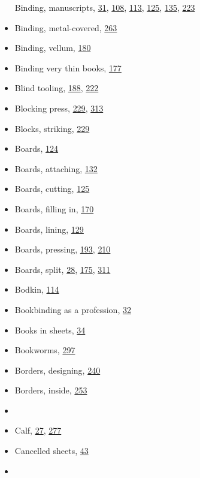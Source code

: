 \documentclass[
]{article}
\begin{document}
\begin{itemize}
  Binding, manuscripts, \protect\hyperlink{Page_31}{31},
  \protect\hyperlink{Page_108}{108}, \protect\hyperlink{Page_113}{113},
  \protect\hyperlink{Page_125}{125}, \protect\hyperlink{Page_135}{135},
  \protect\hyperlink{Page_223}{223}
\item
  Binding, metal-covered, \protect\hyperlink{Page_263}{263}
\item
  Binding, vellum, \protect\hyperlink{Page_180}{180}
\item
  Binding very thin books, \protect\hyperlink{Page_177}{177}
\item
  Blind tooling, \protect\hyperlink{Page_188}{188},
  \protect\hyperlink{Page_222}{222}
\item
  Blocking press, \protect\hyperlink{Page_229}{229},
  \protect\hyperlink{Page_313}{313}
\item
  Blocks, striking, \protect\hyperlink{Page_229}{229}
\item
  Boards, \protect\hyperlink{Page_124}{124}
\item
  Boards, attaching, \protect\hyperlink{Page_132}{132}
\item
  Boards, cutting, \protect\hyperlink{Page_125}{125}
\item
  Boards, filling in, \protect\hyperlink{Page_170}{170}
\item
  Boards, lining, \protect\hyperlink{Page_129}{129}
\item
  Boards, pressing, \protect\hyperlink{Page_193}{193},
  \protect\hyperlink{Page_210}{210}
\item
  Boards, split, \protect\hyperlink{Page_28}{28},
  \protect\hyperlink{Page_175}{175}, \protect\hyperlink{Page_311}{311}
\item
  Bodkin, \protect\hyperlink{Page_114}{114}
\item
  Bookbinding as a profession, \protect\hyperlink{Page_32}{32}
\item
  Books in sheets, \protect\hyperlink{Page_34}{34}
\item
  Bookworms, \protect\hyperlink{Page_297}{297}
\item
  Borders, designing, \protect\hyperlink{Page_240}{240}
\item
  Borders, inside, \protect\hyperlink{Page_253}{253}
\item
  ~
\item
  {Calf}, \protect\hyperlink{Page_27}{27},
  \protect\hyperlink{Page_277}{277}
\item
  Cancelled sheets, \protect\hyperlink{Page_43}{43}
\item

\end{itemize}
\end{document}
